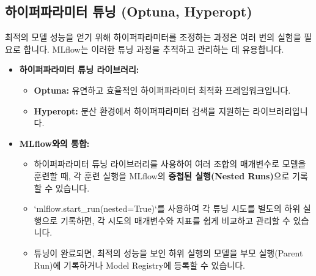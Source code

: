\documentclass[11pt,a4paper]{article}
\begin{document}
\subsection*{하이퍼파라미터 튜닝 (Optuna, Hyperopt)}
최적의 모델 성능을 얻기 위해 하이퍼파라미터를 조정하는 과정은 여러 번의 실험을 필요로 합니다. MLflow는 이러한 튜닝 과정을 추적하고 관리하는 데 유용합니다.
\begin{itemize}
    \item \textbf{하이퍼파라미터 튜닝 라이브러리:}
    \begin{itemize}
        \item \textbf{Optuna:} 유연하고 효율적인 하이퍼파라미터 최적화 프레임워크입니다.
        \item \textbf{Hyperopt:} 분산 환경에서 하이퍼파라미터 검색을 지원하는 라이브러리입니다.
    \end{itemize}
    \item \textbf{MLflow와의 통합:}
    \begin{itemize}
        \item 하이퍼파라미터 튜닝 라이브러리를 사용하여 여러 조합의 매개변수로 모델을 훈련할 때, 각 훈련 실행을 MLflow의 \textbf{중첩된 실행(Nested Runs)}으로 기록할 수 있습니다.
        \item `mlflow.start_run(nested=True)`를 사용하여 각 튜닝 시도를 별도의 하위 실행으로 기록하면, 각 시도의 매개변수와 지표를 쉽게 비교하고 관리할 수 있습니다.
        \item 튜닝이 완료되면, 최적의 성능을 보인 하위 실행의 모델을 부모 실행(Parent Run)에 기록하거나 Model Registry에 등록할 수 있습니다.
    \end{itemize}
\end{itemize}
\end{document}
